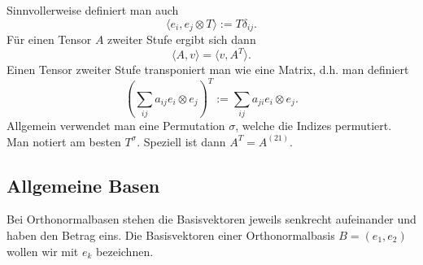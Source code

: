 \documentclass[a4paper,10pt,fleqn,twocolumn,twoside]{article}
\begin{document}
Sinnvollerweise definiert man auch
\begin{equation}
\langle e_i,e_j\otimes T\rangle := T\delta_{ij}.
\end{equation}
Für einen Tensor $A$ zweiter Stufe ergibt sich dann
\begin{equation}
\langle A,v\rangle = \langle v,A^T\rangle.
\end{equation}
Einen Tensor zweiter Stufe transponiert man wie eine Matrix, d.h. man definiert
\begin{equation}
(\sum_{ij}a_{ij}e_i\otimes e_j)^T:=\sum_{ij} a_{ji}e_i\otimes e_j.
\end{equation}
Allgemein verwendet man eine Permutation $\sigma$, welche die
Indizes permutiert. Man notiert am besten $T^\sigma$. Speziell
ist dann $A^T=A^{(21)}$.


\subsection{Allgemeine Basen}

Bei Orthonormalbasen stehen die Basisvektoren jeweils senkrecht
aufeinander und haben den Betrag eins. Die Basisvektoren einer
Orthonormalbasis $B=(e_1,e_2)$ wollen wir mit $e_k$ bezeichnen.
\end{document}
